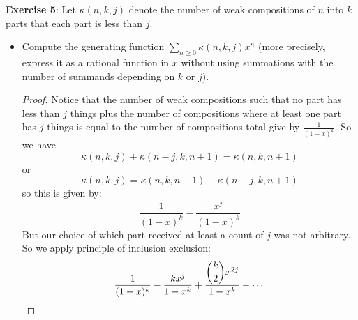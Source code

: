 \documentclass{article}
\begin{document}
\textbf{Exercise 5}: Let $\kappa(n, k, j)$ denote the number of weak compositions of $n$ into $k$ parts that each part is less than $j$.
    \begin{itemize}
        \item Compute the generating function $\sum_{n \geq 0}\kappa(n, k, j)x^{n}$ (more precisely, express it as a rational function in $x$ without using summations with the number of summands depending on $k$ or $j$).
            \begin{proof}
                Notice that the number of weak compositions such that no part has less than $j$ things plus the number of compositions where at least one part has $j$ things is equal to the number of  compositions total give by $\frac{1}{(1 - x)^{k}}$. So we have 
                    \begin{equation*}
                        \kappa(n, k, j) + \kappa(n - j, k, n + 1) = \kappa(n, k, n + 1)
                    \end{equation*}
                or 
                    \begin{equation*}
                        \kappa(n, k, j) = \kappa(n, k, n + 1) - \kappa(n - j, k, n + 1)
                    \end{equation*}
                so this is given by:
                    \begin{equation*}
                        \dfrac{1}{(1 - x)^{k}} - \dfrac{x^{j}}{(1 - x)^{k}}
                    \end{equation*}
                But our choice of which part received at least a count of $j$ was not arbitrary. So we apply principle of inclusion exclusion: 
                    \begin{equation*}
                        \dfrac{1}{(1 - x)^{k}} - \dfrac{kx^{j}}{1 - x^{k}} + \dfrac{\dbinom{k}{2}x^{2j}}{1 - x^{k}} - \cdots 
                    \end{equation*}
            \end{proof}


\end{itemize}
\end{document}
